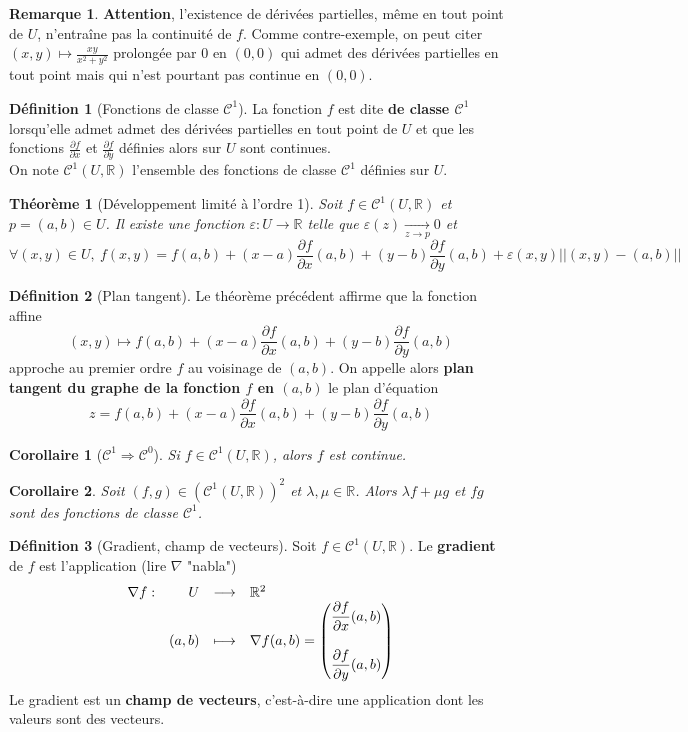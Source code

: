 \documentclass[french]{book}
\newcommand{\R}{\mathbb{R}}
\theoremstyle{plain}
\newtheorem{thm}{Théorème}[chapter]
\newtheorem{cor}{Corollaire}[chapter]
\theoremstyle{definition}
\newtheorem{dfn}{Définition}[chapter]
\newtheorem{rmq}{Remarque}[chapter]
\theoremstyle{remark}
\begin{document}
\begin{rmq} \textbf{Attention}, l'existence de dérivées partielles, même en tout point de $U$, n'entraîne pas la continuité de $f$. Comme contre-exemple, on peut citer $\displaystyle (x,y)\mapsto\frac{xy}{x^2+y^2}$ prolongée par 0 en $(0,0)$ qui admet des dérivées partielles en tout point mais qui n'est pourtant pas continue en $(0,0)$. \end{rmq}
\begin{dfn}[Fonctions de classe $\mathcal{C}^1$]
	La fonction $f$ est dite \textbf{de classe $\mathcal{C}^1$} lorsqu'elle admet admet des dérivées partielles en tout point de $U$ et que les fonctions $\displaystyle \frac{\partial f}{\partial x}$ et $\displaystyle \frac{\partial f}{\partial y}$ définies alors sur $U$ sont continues. \\ On note $\mathcal{C}^1(U,\R)$ l'ensemble des fonctions de classe $\mathcal{C}^1$ définies sur $U$.
\end{dfn}
\begin{thm}[Développement limité à l'ordre 1]
	Soit $f\in\mathcal{C}^1(U,\R)$ et $p=(a,b)\in U$. Il existe une fonction $\varepsilon:U\rightarrow\R$ telle que $\varepsilon(z)\xrightarrow[z\to p]{}0$ et $$\forall(x,y)\in U, \ f(x,y)=f(a,b)+(x-a)\frac{\partial f}{\partial x}(a,b)+(y-b)\frac{\partial f}{\partial y}(a,b)+\varepsilon(x,y)||(x,y)-(a,b)||$$
\end{thm}
\begin{dfn}[Plan tangent]
	Le théorème précédent affirme que la fonction affine $$(x,y)\mapsto f(a,b)+(x-a)\frac{\partial f}{\partial x}(a,b)+(y-b)\frac{\partial f}{\partial y}(a,b)$$ approche au premier ordre $f$ au voisinage de $(a,b)$. On appelle alors \textbf{plan tangent du graphe de la fonction $f$ en $(a,b)$} le plan d'équation $$z=f(a,b)+(x-a)\frac{\partial f}{\partial x}(a,b)+(y-b)\frac{\partial f}{\partial y}(a,b)$$
\end{dfn}
\begin{cor}[$\mathcal{C}^1 \Longrightarrow \mathcal{C}^0$]
	Si $f\in\mathcal{C}^1(U,\R)$, alors $f$ est continue.
\end{cor}
\begin{cor}
	Soit $(f,g)\in(\mathcal{C}^1(U,\R))^2$ et $\lambda,\mu\in\R$. Alors $\lambda f +\mu g$ et $fg$ sont des fonctions de classe $\mathcal{C}^1$.
\end{cor}
\begin{dfn}[Gradient, champ de vecteurs]
	Soit $f\in\mathcal{C}^1(U,\R)$. Le \textbf{gradient} de $f$ est l'application (lire $\nabla$ "nabla")
	$$
	\begin{array}[t]{lrcl}
		\nabla f: & U & \longrightarrow & \R^2 \\
		& (a,b) & \longmapsto & \displaystyle \nabla f(a,b)=\begin{pmatrix}
			\dfrac{\partial f}{\partial x}(a,b) \\[6mm]
			\dfrac{\partial f}{\partial y}(a,b)
		\end{pmatrix}
	\end{array}
	$$ Le gradient est un \textbf{champ de vecteurs}, c'est-à-dire une application dont les valeurs sont des vecteurs.
\end{dfn}
\end{document}
